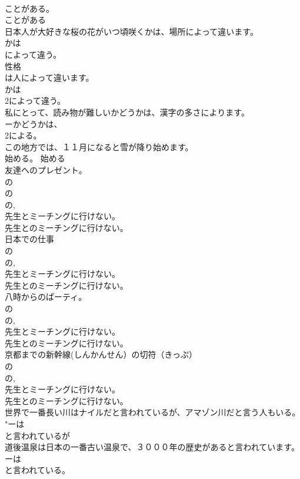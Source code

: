 \documentclass[8pt]{extreport}
\begin{document}
\begin{CJK}{UTF8}{min}
\\	ことがある。 
\\	ことがある 
\\	日本人が大好きな桜の花がいつ頃咲くかは、場所によって違います。	
\\	かは
\\	によって違う。 
\\	性格
\\	は人によって違います。	
\\	かは
\\	2によって違う。 
\\	私にとって、読み物が難しいかどうかは、漢字の多さによります。	
\\	ーかどうかは、
\\	2による。 
\\	この地方では、１１月になると雪が降り始めます。	
\\	始める。 始める 
\\	友達へのプレゼント。	
\\	の
\\	の
\\	の, 
\\	先生とミーチングに行けない。
\\	先生とのミーチングに行けない。
\\	日本での仕事	
\\	の
\\	の, 
\\	先生とミーチングに行けない。
\\	先生とのミーチングに行けない。
\\	八時からのぱーティ。	
\\	の
\\	の, 
\\	先生とミーチングに行けない。
\\	先生とのミーチングに行けない。
\\	京都までの新幹線(しんかんせん）の切符（きっぷ）	
\\	の
\\	の, 
\\	先生とミーチングに行けない。
\\	先生とのミーチングに行けない。
\\	世界で一番長い川はナイルだと言われているが、アマゾン川だと言う人もいる。	
\\	"ーは
\\	と言われているが
\\	道後温泉は日本の一番古い温泉で、３０００年の歴史があると言われています。	
\\	ーは
\\	と言われている。 

\end{CJK}
\end{document}
